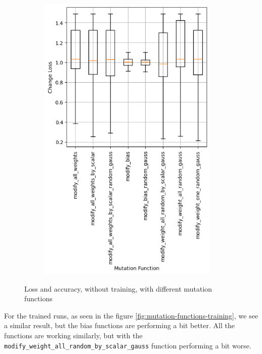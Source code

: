 \begin{figure}
\begin{subfigure}{0.5\textwidth}
        \includegraphics[width=0.95\textwidth]{plots/Mutatation_NotTrained_loss.png}
    \end{subfigure}
    \caption{Loss and accuracy, without training, with different mutation functions}
    \label{fig:mutation-functions-notraining}
\end{figure}
For the trained runs, as seen in the figure \ref{fig:mutation-functions-training}, we see a similar result, but the bias functions are performing a bit better.
All the functions are working similarly, but with the \texttt{modify\_weight\_all\_random\_by\_scalar\_gauss} function performing a bit worse.
